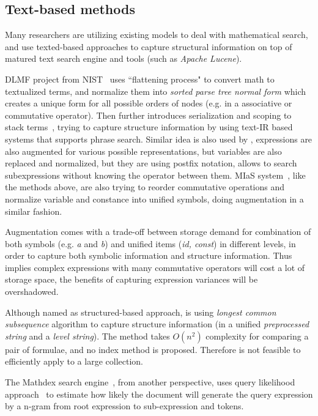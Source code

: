 \subsection{Text-based methods}
Many researchers are utilizing existing models to deal with mathematical search, and use texted-based approaches to capture structural information on top of matured text search engine and tools (such as \textit{Apache Lucene}). 

DLMF project from NIST~\cite{Youssef03} uses ``flattening process" to convert math to textualized terms, and normalize them into \textit{sorted parse tree normal form} which creates a unique form for all possible orders of nodes (e.g. in a associative or commutative operator). 
Then further introduces serialization and scoping to stack terms~\cite{Youssef05}, trying to capture structure information by using text-IR based systems that supports phrase search. 
Similar idea is also used by \cite{extending08}, expressions are also augmented for various possible representations, but variables are also replaced and normalized, but they are using postfix notation, allows to search subexpressions without knowing the operator between them.  
MIaS system~\cite{mias11a,mias11,mias:thesis}, like the methods above, are also trying to reorder commutative operations and normalize variable and constance into unified symbols, doing augmentation in a similar fashion. 

Augmentation comes with a trade-off between storage demand for combination of both symbols (e.g. \textit{a} and \textit{b}) and unified items (\textit{id, const}) in different levels, in order to capture both symbolic information and structure information. Thus implies complex expressions with many commutative operators will cost a lot of storage space, the benefits of capturing expression variances will be overshadowed.

Although named as structured-based approach, \cite{not-really-struct} is using \textit{longest common subsequence} algorithm to capture structure information (in a unified \textit{preprocessed string} and a \textit{level string}). The method takes $O(n^2)$ complexity for comparing a pair of formulae, and no index method is proposed. Therefore is not feasible to efficiently apply to a large collection.

The Mathdex search engine~\cite{queryf_datan07}, from another perspective, uses query likelihood approach~\cite{iir} to estimate how likely the document will generate the query expression by a n-gram from root expression to sub-expression and tokens.

